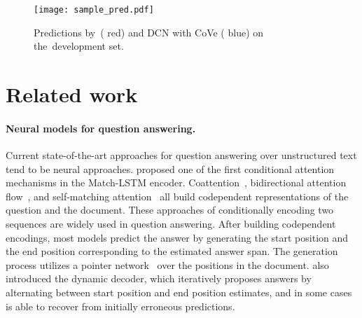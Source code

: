 \documentclass{article} %
\begin{document}
\begin{figure}[!htb]
\vspace{-3mm}
\texttt{[image: sample\_pred.pdf]}
\vspace{-3mm}
\caption{
	Predictions by~\modelname ({\color{myred} red}) and DCN with CoVe ({\color{myblue} blue}) on the~\squad development set.
}\label{fig:sample_pred}
\vspace{-2mm}
\end{figure}



\section{Related work}
\vspace{-2mm}


\paragraph{Neural models for question answering.}
Current state-of-the-art approaches for question answering over unstructured text tend to be neural approaches.
\citet{Wang2016MachineCU} proposed one of the first conditional attention mechanisms in the Match-LSTM encoder.
Coattention~\citep{xiong2016dynamic}, bidirectional attention flow~\citep{Seo2016BidirectionalAF}, and self-matching attention~\citep{rnet} all build codependent representations of the question and the document.
These approaches of conditionally encoding two sequences are widely used in question answering.
After building codependent encodings, most models predict the answer by generating the start position and the end position corresponding to the estimated answer span.
The generation process utilizes a pointer network~\citep{Vinyals2015PointerN} over the positions in the document.
\citet{xiong2016dynamic} also introduced the dynamic decoder, which iteratively proposes answers by alternating between start position and end position estimates, and in some cases is able to recover from initially erroneous predictions.
\end{document}
